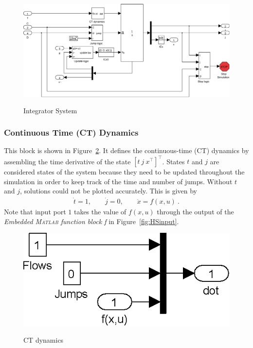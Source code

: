 \documentclass{article}
\newcommand{\matlab}{\textsc{Matlab}}
\begin{document}
\begin{figure}[ht]
  \begin{center}
    {\includegraphics[width=.95\textwidth]{figures/Simulink/Integrator.eps}}
   \caption{Integrator System}
\label{fig:integratorsystem}
  \end{center}
\end{figure}


\subsubsection{Continuous Time (CT) Dynamics}

This block is shown in Figure~\ref{fig:CTdynamics}. 
It defines the continuous-time (CT) dynamics by assembling the 
time derivative of the state $[t\ j\ x^\top]^\top$. 
States $t$ and $j$ are considered states of the system because 
they need to be updated throughout the simulation in order to 
keep track of the time and number of jumps. Without $t$ and $j$, 
solutions could not be plotted accurately.
This is given by
\begin{eqnarray*}
\dot{t} = 1, \qquad \dot{j} = 0, \qquad \dot{x} = f(x,u)\ .
\end{eqnarray*}
Note that input port $1$ takes the value of $f(x,u)$ through the output of the
{\em Embedded \matlab{} function block f} in Figure~\ref{fig:HSinput}.

\begin{figure}[ht]
  \begin{center}
    {\includegraphics[width=.4\textwidth]{figures/Simulink/CTdynamics.eps}}
   \caption{CT dynamics}
\label{fig:CTdynamics}
 \end{center}
\end{figure}
\end{document}

